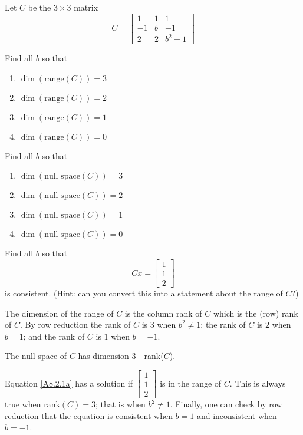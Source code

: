 \documentclass{ximera}
\begin{document}
\begin{exercise} \label{A8.2.1}
Let $C$ be the $3 \times 3$ matrix
\[
C=\begin{bmatrix} 
1 & 1 & 1 \\ 
-1 & b  &  -1 \\ 
2 & 2 & b^2+1 
\end{bmatrix}
\]
\begin{enumeratea}
\item Find all $b$ so that
	\begin{enumerate}
	\item $\dim(\text{range}(C))=3$
	\item $\dim(\text{range}(C))=2$
	\item $\dim(\text{range}(C))=1$
	\item $\dim(\text{range}(C))=0$
	\end{enumerate}

\item Find all $b$ so that
	\begin{enumerate}
	\item $\dim(\text{null space}(C))=3$
	\item $\dim(\text{null space}(C))=2$
	\item $\dim(\text{null space}(C))=1$
	\item $\dim(\text{null space}(C))=0$
	\end{enumerate}
	
\item Find all $b$ so that 
\begin{equation} \label{A8.2.1a}
Cx=\begin{bmatrix} 1 \\ 1 \\2 \end{bmatrix}
\end{equation}
is consistent. (Hint: can you convert this into a statement about the range of $C$?)
\end{enumeratea}

\begin{solution}
\soln
\begin{enumeratea}
\item The dimension of the range of $C$ is the column rank of $C$ which is the (row) rank of $C$.  By row reduction the rank of $C$ is $3$ when $b^2\neq 1$; the rank of $C$ is $2$ when $b=1$; and the rank of $C$ is $1$ when $b=-1$. 

\item The null space of $C$ has dimension 3 - rank($C$).

\item Equation \eqref{A8.2.1a} has a solution if $\begin{bmatrix} 1 \\ 1 \\2 \end{bmatrix}$ is in the range of $C$.  This is always true when rank$(C) = 3$; that is when $b^2\neq 1$. Finally, one can check by row reduction that the equation is consistent when $b=1$ and inconsistent when $b=-1$.  
\end{enumeratea}

\end{solution}
\end{exercise}
\end{document}
